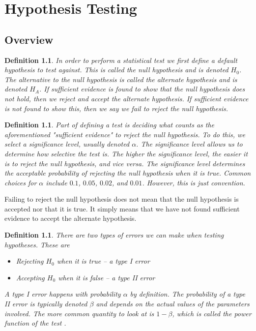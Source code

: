 \documentclass[1pt]{report}
\newtheorem{defn}[thm]{Definition}
\newcommand{\<}{\langle}
\renewcommand{\>}{\rangle}
\begin{document}
\chapter{Hypothesis Testing}
\section{Overview}
\begin{defn}\label{def:hypothesis}
In order to perform a statistical test we first define a default hypothesis to test against. This is called the \emph{null hypothesis} and is denoted $H_0$. The alternative to the null hypothesis is called the \emph{alternate hypothesis} and is denoted $H_A$. If sufficient evidence is found to show that the null hypothesis does not hold, then we \emph{reject} and \emph{accept} the alternate hypothesis. If sufficient evidence is not found to show this, then we say we \emph{fail to reject} the null hypothesis.
\end{defn}
\begin{defn}\label{def:significance}
Part of defining a test is deciding what counts as the aforementioned "sufficient evidence" to reject the null hypothesis. To do this, we select a \emph{significance level}, usually denoted $\alpha$. The significance level allows us to determine how selective the test is. The higher the significance level, the easier it is to reject the null hypothesis, and vice versa. The significance level determines the acceptable probability of rejecting the null hypothesis when it is true. Common choices for $\alpha$ include $0.1$, $0.05$, $0.02$, and $0.01$. However, this is just convention.
\end{defn}
\begin{rmkbox}
Failing to reject the null hypothesis does not mean that the null hypothesis is accepted nor that it is true. It simply means that we have not found sufficient evidence to accept the alternate hypothesis. 
\end{rmkbox}
\begin{defn}\label{def:errortypes}
There are two types of errors we can make when testing hypotheses. These are
\begin{itemize}
\item Rejecting $H_0$ when it is true -- a \emph{type I error}
\item Accepting $H_0$ when it is false -- a \emph{type II error}
\end{itemize}
A type I error happens with probability $\alpha$ by definition. The probability of a type II error is typically denoted $\beta$ and depends on the actual values of the parameters involved. The more common quantity to look at is $1-\beta$, which is called the \emph{power function} of the test .
\end{defn}
\end{document}

